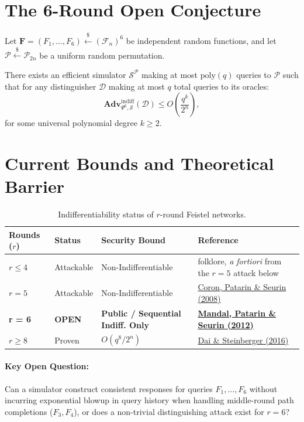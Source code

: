 \documentclass{conjura-conjecture}
\begin{document}
\section{The 6-Round Open Conjecture}

\begin{conjecture}
Let $\mathbf{F} = (F_1, \dots, F_6) \stackrel{\$}{\leftarrow} (\mathcal{F}_n)^6$ be independent random functions, and let $\mathcal{P} \stackrel{\$}{\leftarrow} \mathcal{P}_{2n}$ be a uniform random permutation.

There exists an efficient simulator $\mathcal{S}^{\mathcal{P}}$ making at most $\mathrm{poly}(q)$ queries to $\mathcal{P}$ such that for any distinguisher $\mathcal{D}$ making at most $q$ total queries to its oracles:
\begin{equation}
\mathbf{Adv}_{\Psi^6, \mathcal{S}}^{\mathrm{indiff}}(\mathcal{D}) \le O\left( \frac{q^k}{2^n} \right),
\end{equation}
for some universal polynomial degree $k \ge 2$.
\end{conjecture}

\section{Current Bounds and Theoretical Barrier}

\begin{table}[h!]
\centering
\small
\begin{tabularx}{\textwidth}{@{}llXX@{}}
\toprule
\textbf{Rounds ($r$)} & \textbf{Status} & \textbf{Security Bound} & \textbf{Reference} \\ \midrule
$r \le 4$ & Attackable & Non-Indifferentiable & folklore, \emph{a fortiori} from the $r=5$ attack below \\
$r = 5$ & Attackable & Non-Indifferentiable & \href{https://eprint.iacr.org/2008/246}{Coron, Patarin \& Seurin (2008)} \\
\textbf{r = 6} & \textbf{OPEN} & \textbf{Public / Sequential Indiff. Only} & \href{https://eprint.iacr.org/2011/496}{\textbf{Mandal, Patarin \& Seurin (2012)}} \\
$r \ge 8$ & Proven & $O(q^8/2^n)$ & \href{https://eprint.iacr.org/2015/1069}{Dai \& Steinberger (2016)} \\ \bottomrule
\end{tabularx}
\caption{Indifferentiability status of $r$-round Feistel networks.}
\end{table}

\paragraph{Key Open Question:}
Can a simulator construct consistent responses for queries $F_1, \dots, F_6$ without incurring exponential blowup in query history when handling middle-round path completions ($F_3, F_4$), or does a non-trivial distinguishing attack exist for $r=6$?
\end{document}
